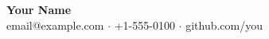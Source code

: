 \documentclass[11pt]{article}
\begin{document}
\begin{center}
  {\Large \textbf{Your Name}}\\
  email@example.com $\cdot$ +1-555-0100 $\cdot$ github.com/you
\end{center}





\end{document}
